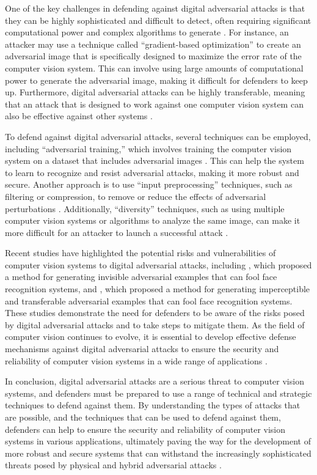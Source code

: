 \documentclass[11pt]{article}
\begin{document}
One of the key challenges in defending against digital adversarial attacks is that they can be highly sophisticated and difficult to detect, often requiring significant computational power and complex algorithms to generate \cite{ref2}. For instance, an attacker may use a technique called ``gradient-based optimization'' to create an adversarial image that is specifically designed to maximize the error rate of the computer vision system. This can involve using large amounts of computational power to generate the adversarial image, making it difficult for defenders to keep up. Furthermore, digital adversarial attacks can be highly transferable, meaning that an attack that is designed to work against one computer vision system can also be effective against other systems \cite{ref67}.

To defend against digital adversarial attacks, several techniques can be employed, including ``adversarial training,'' which involves training the computer vision system on a dataset that includes adversarial images \cite{ref68}. This can help the system to learn to recognize and resist adversarial attacks, making it more robust and secure. Another approach is to use ``input preprocessing'' techniques, such as filtering or compression, to remove or reduce the effects of adversarial perturbations \cite{ref69}. Additionally, ``diversity'' techniques, such as using multiple computer vision systems or algorithms to analyze the same image, can make it more difficult for an attacker to launch a successful attack \cite{ref37}.

Recent studies have highlighted the potential risks and vulnerabilities of computer vision systems to digital adversarial attacks, including \cite{ref36}, which proposed a method for generating invisible adversarial examples that can fool face recognition systems, and \cite{ref70}, which proposed a method for generating imperceptible and transferable adversarial examples that can fool face recognition systems. These studies demonstrate the need for defenders to be aware of the risks posed by digital adversarial attacks and to take steps to mitigate them. As the field of computer vision continues to evolve, it is essential to develop effective defense mechanisms against digital adversarial attacks to ensure the security and reliability of computer vision systems in a wide range of applications \cite{ref71}.

In conclusion, digital adversarial attacks are a serious threat to computer vision systems, and defenders must be prepared to use a range of technical and strategic techniques to defend against them. By understanding the types of attacks that are possible, and the techniques that can be used to defend against them, defenders can help to ensure the security and reliability of computer vision systems in various applications, ultimately paving the way for the development of more robust and secure systems that can withstand the increasingly sophisticated threats posed by physical and hybrid adversarial attacks \cite{ref72}.
\end{document}
